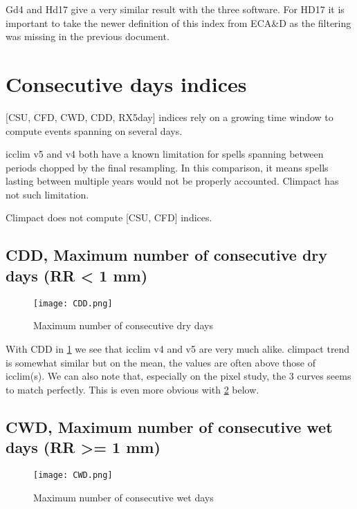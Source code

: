 \documentclass[a4paper,11pt]{article}
\begin{document}
        Gd4 and Hd17 give a very similar result with the three software.
        For HD17 it is important to take the newer definition of this index from ECA\&D \cite{doc/ecad_new} as the filtering was missing in the previous document.

    \section{Consecutive days indices} \label{section/consecutive_days}
        [CSU, CFD, CWD, CDD, RX5day] indices rely on a growing time window to compute events spanning on several days.

        icclim v5 and v4 both have a known limitation for spells spanning between periods chopped by the final resampling. 
        In this comparison, it means spells lasting between multiple years would not be properly accounted.
        Climpact has not such limitation.

        Climpact does not compute [CSU, CFD] indices.

    \subsection{CDD, Maximum number of consecutive dry days (RR < 1 mm)}
        \begin{figure}[!hbt]
            \centering
            \texttt{[image: CDD.png]}
            \caption{Maximum number of consecutive dry days}
            \label{figure/cdd}
        \end{figure}

        With CDD in \ref{figure/cdd} we see that icclim v4 and v5 are very much alike.
        climpact trend is somewhat similar but on the mean, the values are often above those of icclim(s).
        We can also note that, especially on the pixel study, the 3 curves seems to match perfectly.
        This is even more obvious with \ref{figure/cwd} below.

    \subsection{CWD, Maximum number of consecutive wet days (RR >= 1 mm)}
        \begin{figure}[!hbt]
            \centering
            \texttt{[image: CWD.png]}
            \caption{Maximum number of consecutive wet days}
            \label{figure/cwd}
        \end{figure}
\end{document}
